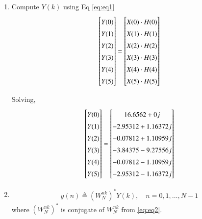 \documentclass[journal,12pt,twocolumn]{IEEEtran}
\renewcommand\thesection{\arabic{section}}
\begin{document}
\begin{enumerate}[label=\thesection.\arabic*.,ref=\thesection.\theenumi]
\item Compute $Y(k)$ using 	Eq \eqref{eq:eq1}
\begin{equation}
\renewcommand{\arraystretch}{1.45}
\setlength\arraycolsep{0.01pt}
\begin{bmatrix} 
Y(0) \\ Y(1) \\ Y(2) \\ Y(3) \\ Y(4) \\ Y(5) 
\end{bmatrix}
=
\begin{bmatrix}
X(0)\cdot H(0) \\ X(1)\cdot H(1) \\ X(2)\cdot H(2) \\ X(3)\cdot H(3) \\ X(4)\cdot H(4) \\ X(5)\cdot H(5)
\end{bmatrix}
\end{equation}

Solving,
\begin{equation}
\renewcommand{\arraystretch}{1.45}
\setlength\arraycolsep{0.01pt}
\begin{bmatrix} 
Y(0) \\ Y(1) \\ Y(2) \\ Y(3) \\ Y(4) \\ Y(5) 
\end{bmatrix}
=
\begin{bmatrix}
16.6562+0j \\ -2.95312+1.16372j \\ -0.07812+1.10959j \\ -3.84375-9.27556j \\ -0.07812-1.10959j \\ -2.95312-1.16372j 
\end{bmatrix}
\end{equation}

\item
\begin{align}
    y(n) \triangleq (W_{N}^{nk})^{*} Y(k), \quad n=0,1, \ldots, N-1
\end{align}
where $(W_{N}^{nk})^{*}$ is conjugate of $W_{N}^{nk}$ from \eqref{eq:eq2}.


\end{enumerate}
\end{document}
